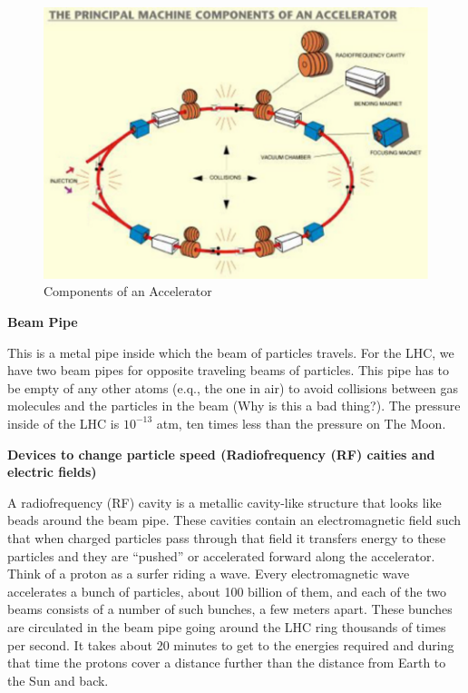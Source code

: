 \;
\;

\begin{figure}[h]
\centering\includegraphics[scale=0.5]{./Particleaccelerators/Pictures/fig2.pdf}
\caption{Components of an Accelerator}
\label{fig:acc2}
\end{figure}

\;
\;
\;

\noindent
\textbf{Beam Pipe}

\;
\;

\noindent 
This is a metal pipe inside which the beam of particles travels. For the LHC, we have two beam pipes for opposite traveling beams of particles. This pipe has to be empty of any other atoms (e.q., the one in air) to avoid collisions between gas molecules and the particles in the beam (Why is this a bad thing?). The pressure inside of the LHC is $ 10^{-13}$ atm, ten times less than the pressure on The Moon.

\;
\;
\;

\noindent
\textbf{Devices to change particle speed (Radiofrequency (RF) caities and electric fields)}

\;
\;

\noindent
A radiofrequency (RF) cavity is a metallic cavity-like structure that looks like beads around the beam pipe. These cavities contain an electromagnetic field such that when charged particles pass through that field it transfers energy to these particles and they are ``pushed'' or accelerated forward along the accelerator. Think of a proton as a surfer riding a wave.  Every electromagnetic wave accelerates a bunch of particles, about 100 billion of them, and each of the two beams consists of a number of such bunches, a few meters apart. These bunches are circulated in the beam pipe going around the LHC ring thousands of times per second. It takes about 20 minutes to get to the energies required and during that time the protons cover a distance further than the distance from Earth to the Sun and back.

